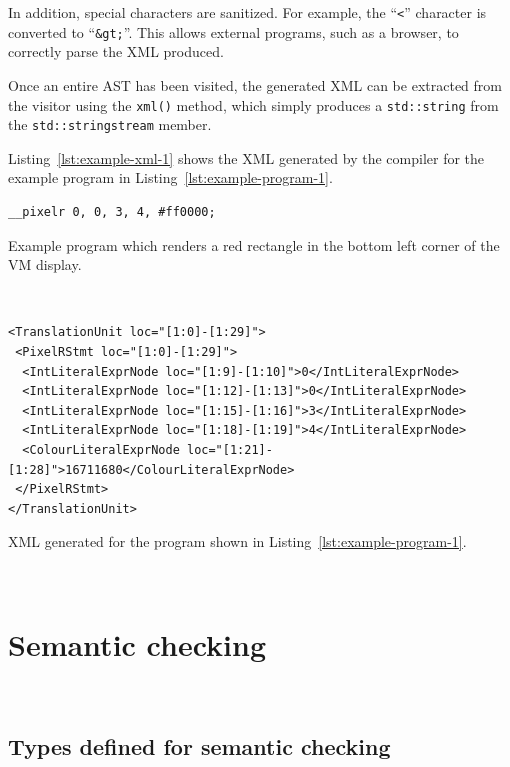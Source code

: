 \documentclass[11pt,a4paper]{scrartcl}
\begin{document}
In addition, special characters are sanitized. For example, the ``\verb|<|'' character is converted to ``\verb!&gt;!''. This allows external programs, such as a browser, to correctly parse the XML produced.

Once an entire AST has been visited, the generated XML can be extracted from the visitor using the \verb!xml()! method, which simply produces a \verb!std::string! from the \verb!std::stringstream! member.

Listing~\ref{lst:example-xml-1} shows the XML generated by the compiler for the example program in Listing~\ref{lst:example-program-1}.

\begin{lstfloat}

\begin{verbatim}
__pixelr 0, 0, 3, 4, #ff0000;
\end{verbatim}
  \caption{Example program which renders a red rectangle in the bottom left corner of the VM display.}~\label{lst:example-program-1}
\end{lstfloat}

\begin{lstfloat}

\begin{verbatim}
<TranslationUnit loc="[1:0]-[1:29]">
 <PixelRStmt loc="[1:0]-[1:29]">
  <IntLiteralExprNode loc="[1:9]-[1:10]">0</IntLiteralExprNode>
  <IntLiteralExprNode loc="[1:12]-[1:13]">0</IntLiteralExprNode>
  <IntLiteralExprNode loc="[1:15]-[1:16]">3</IntLiteralExprNode>
  <IntLiteralExprNode loc="[1:18]-[1:19]">4</IntLiteralExprNode>
  <ColourLiteralExprNode loc="[1:21]-[1:28]">16711680</ColourLiteralExprNode>
 </PixelRStmt>
</TranslationUnit>
\end{verbatim}
  \caption{XML generated for the program shown in Listing~\ref{lst:example-program-1}.}~\label{lst:example-xml-1}

\end{lstfloat}

\newpage

\section{Semantic checking}~\label{sec:semantic-checker}

\subsection{Types defined for semantic checking}
\end{document}
